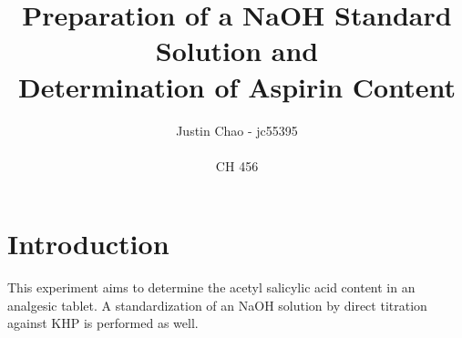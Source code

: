 \documentclass{article}
\begin{document}
\title {Preparation of a NaOH Standard Solution and \\ Determination of Aspirin
Content} 
\author {Justin Chao - jc55395 \\ \\ CH 456}
\maketitle

\vspace {50mm}

\newpage
\doublespacing
\section {Introduction}
This experiment aims to determine the acetyl salicylic acid content in an analgesic tablet. 
A standardization of an NaOH solution by direct titration against KHP is performed as well.
\end{document}
